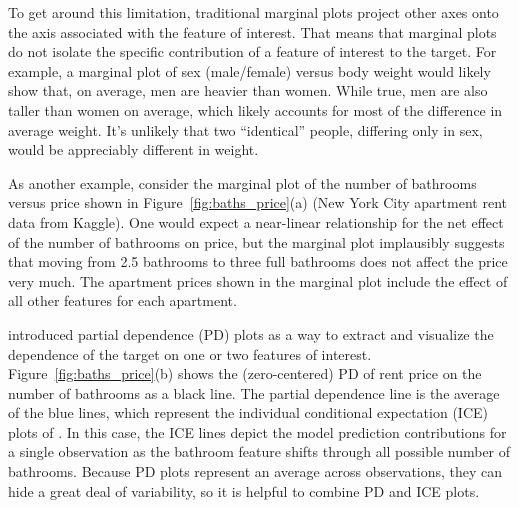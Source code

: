 \documentclass[12pt]{article}
\newcommand{\figref}[1]{Figure~\ref{#1}}
\begin{document}
To get around this limitation, traditional marginal plots project other axes onto the axis associated with the feature of interest.  That means that marginal plots do not isolate the specific contribution of a feature of interest to the target. For example, a marginal plot of sex (male/female) versus body weight would likely show that, on average, men are heavier than women. While true, men are also taller than women on average, which likely accounts for most of the difference in average weight. It's unlikely that two ``identical'' people, differing only in sex, would be appreciably different in weight.  

As another example, consider the marginal plot of the number of bathrooms versus price shown in \figref{fig:baths_price}(a) (New York City apartment rent data from Kaggle). One would expect a near-linear relationship for the net effect of the number of bathrooms on price, but the marginal plot implausibly suggests that moving from 2.5 bathrooms to three full bathrooms does not affect the price very much.  The apartment prices shown in the marginal plot include the effect of all other features for each apartment.

\cite{PDP} introduced partial dependence (PD) plots as a way to extract and visualize the dependence of the target on one or two features of interest. \figref{fig:baths_price}(b) shows the (zero-centered) PD of rent price on the number of bathrooms as a black line. The partial dependence line is the average of the blue lines, which represent the individual conditional expectation (ICE) plots of \cite{ICE}.  In this case, the ICE lines depict the model prediction contributions for a single observation as the bathroom feature shifts through all possible number of bathrooms. Because PD plots represent an average across observations, they can hide a great deal of variability, so it is helpful to combine PD and ICE plots.
\end{document}
